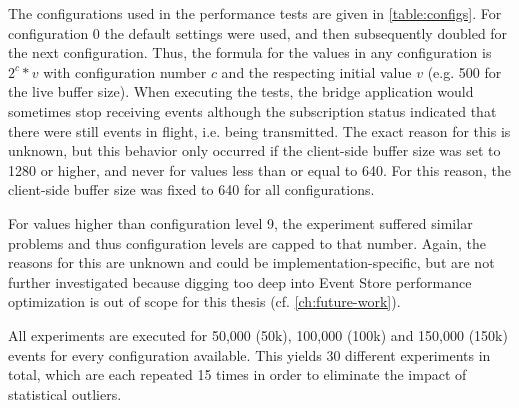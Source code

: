 The configurations used in the performance tests are given in \cref{table:configs}.
For configuration 0 the default settings were used, and then subsequently doubled for the next configuration.
Thus, the formula for the values in any configuration is $ 2^c * v $ with configuration number $c$ and the respecting initial value $v$ (e.g. 500 for the live buffer size).
When executing the tests, the bridge application would sometimes stop receiving events although the subscription status indicated that there were still events in flight, i.e. being transmitted.
The exact reason for this is unknown, but this behavior only occurred if the client-side buffer size was set to 1280 or higher, and never for values less than or equal to 640.
For this reason, the client-side buffer size was fixed to 640 for all configurations.

For values higher than configuration level 9, the experiment suffered similar problems and thus configuration levels are capped to that number.
Again, the reasons for this are unknown and could be implementation-specific, but are not further investigated because digging too deep into Event Store performance optimization is out of scope for this thesis (cf. \cref{ch:future-work}).

\begin{table}
\caption{Configuration table}
\centering
{}
\label{table:configs}
\end{table}

All experiments are executed for 50,000 (50k), 100,000 (100k) and 150,000 (150k) events for every configuration available.
This yields 30 different experiments in total, which are each repeated 15 times in order to eliminate the impact of statistical outliers.

